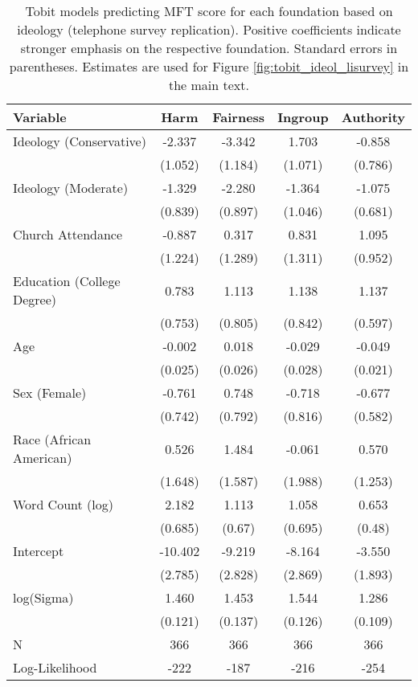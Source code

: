\begin{table}[ht]
\centering
\caption{Tobit models predicting MFT score for each foundation based 
           on ideology (telephone survey replication). Positive coefficients indicate stronger emphasis on the respective 
           foundation. Standard errors in parentheses. Estimates are used for Figure 
           \ref{fig:tobit_ideol_lisurvey} in the main text.} 
\label{tab:tobit_ideol_lisurvey}
\begingroup\footnotesize
\begin{tabular}{lcccc}
  \hline
Variable & Harm & Fairness & Ingroup & Authority \\ 
  \hline
Ideology (Conservative) &  -2.337 & -3.342 &  1.703 & -0.858 \\ 
   & (1.052) & (1.184) & (1.071) & (0.786) \\ 
  Ideology (Moderate) &  -1.329 & -2.280 & -1.364 & -1.075 \\ 
   & (0.839) & (0.897) & (1.046) & (0.681) \\ 
  Church Attendance &  -0.887 &  0.317 &  0.831 &  1.095 \\ 
   & (1.224) & (1.289) & (1.311) & (0.952) \\ 
  Education (College Degree) &   0.783 &  1.113 &  1.138 &  1.137 \\ 
   & (0.753) & (0.805) & (0.842) & (0.597) \\ 
  Age &  -0.002 &  0.018 & -0.029 & -0.049 \\ 
   & (0.025) & (0.026) & (0.028) & (0.021) \\ 
  Sex (Female) &  -0.761 &  0.748 & -0.718 & -0.677 \\ 
   & (0.742) & (0.792) & (0.816) & (0.582) \\ 
  Race (African American) &   0.526 &  1.484 & -0.061 &  0.570 \\ 
   & (1.648) & (1.587) & (1.988) & (1.253) \\ 
  Word Count (log) &   2.182 &  1.113 &  1.058 &  0.653 \\ 
   & (0.685) & (0.67) & (0.695) & (0.48) \\ 
  Intercept & -10.402 & -9.219 & -8.164 & -3.550 \\ 
   & (2.785) & (2.828) & (2.869) & (1.893) \\ 
  log(Sigma) &   1.460 &  1.453 &  1.544 &  1.286 \\ 
   & (0.121) & (0.137) & (0.126) & (0.109) \\ 
   \hline
N & 366 & 366 & 366 & 366 \\ 
  Log-Likelihood & -222 & -187 & -216 & -254 \\ 
   \hline
\end{tabular}
\endgroup
\end{table}
